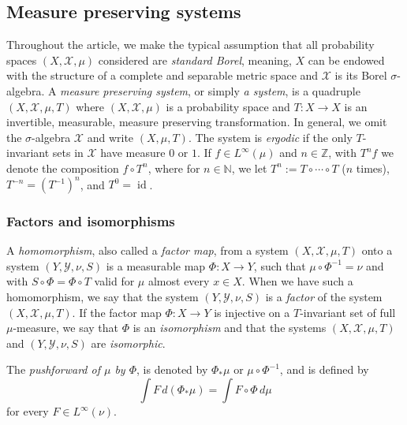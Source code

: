 \documentclass[11pt]{amsart}
\theoremstyle{definition}
\newcommand{\N}{{\mathbb N}}
\newcommand{\Z}{{\mathbb Z}}
\newcommand{\CX}{{\mathcal X}}
\newcommand{\CY}{{\mathcal Y}}
\newcommand{\inv}{^{-1}}
\DeclareMathOperator{\id}{id}
\begin{document}
\subsection{Measure preserving systems}\label{SS:mps}
Throughout the article, we make the typical assumption that all probability  spaces $(X,\CX,\mu)$ considered are {\em standard Borel}, meaning, $X$ can be endowed with the structure of a complete and separable metric space and $\CX$ is its Borel $\sigma$-algebra.
A {\em measure preserving system}, or simply {\em a system}, is a quadruple $(X,\CX,\mu,T)$
where $(X,\CX,\mu)$ is a probability space and $T\colon X\to X$ is an invertible, measurable,  measure preserving transformation.
In general, we omit the $\sigma$-algebra $\CX$  and write $(X,\mu,T)$.
The system is {\em ergodic} if the only $T$-invariant sets in $\CX$ have measure $0$ or $1$. If $f\in L^\infty(\mu)$ and $n\in\Z$, with $T^nf$ we denote the composition $f\circ T^n$, where for $n\in\N$, we let $T^n:=T\circ\cdots\circ T$ ($n$ times),  $T^{-n}=(T\inv)^n$,  and $T^0=\id$.


\subsubsection*{Factors and isomorphisms}
A {\it homomorphism},  also called a \emph{factor map}, from a system $(X,\CX,\mu, T)$ onto a
system $(Y, \CY, \nu, S)$ is a measurable map $\Phi\colon X\to Y$,
such that
$\mu\circ\Phi^{-1} = \nu$ and with $S\circ\Phi = \Phi\circ T$ valid  for $\mu$ almost every $x\in X$.
When we have such a homomorphism, we say that the system $(Y, \CY,
\nu, S)$ is a {\it factor} of the system $(X,\CX,\mu, T)$.  If
the factor map $\Phi\colon X\to Y$ is injective on a $T$-invariant set of full $\mu$-measure,
we say that $\Phi$ is an \emph{isomorphism} and that
the systems $(X,\CX, \mu, T)$ and $(Y, \CY, \nu, S)$
are {\it isomorphic}.


  The {\em pushforward of $\mu$ by $\Phi$}, is denoted by $\Phi_*\mu$ or $\mu\circ\Phi^{-1}$, and is defined by
 $$
 \int F\, d(\Phi_*\mu)=\int F\circ \Phi\, d\mu
 $$
 for every $F\in L^\infty(\nu)$.
\end{document}
